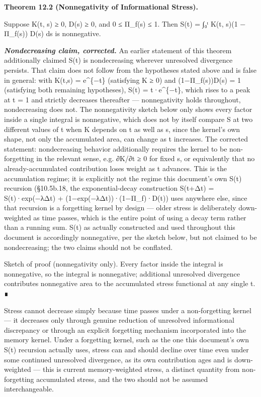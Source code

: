 \documentclass[
]{article}
\begin{document}
\textbf{Theorem 12.2 (Nonnegativity of Informational Stress).}

Suppose K(t, s) ≥ 0, D(s) ≥ 0, and 0 ≤ Π\_f(s) ≤ 1. Then S(t) = ∫₀ᵗ K(t,
s)(1 − Π\_f(s)) D(s) ds is nonnegative.

\emph{\textbf{Nondecreasing claim, corrected.}} An earlier statement of
this theorem additionally claimed S(t) is nondecreasing wherever
unresolved divergence persists. That claim does not follow from the
hypotheses stated above and is false in general: with K(t,s) =
e\^{}\{−t\} (satisfying K ≥ 0) and (1−Π\_f(s))D(s) = 1 (satisfying both
remaining hypotheses), S(t) = t·e\^{}\{−t\}, which rises to a peak at t
= 1 and strictly decreases thereafter --- nonnegativity holds
throughout, nondecreasing does not. The nonnegativity sketch below only
shows every factor inside a single integral is nonnegative, which does
not by itself compare S at two different values of t when K depends on t
as well as s, since the kernel's own shape, not only the accumulated
area, can change as t increases. The corrected statement: nondecreasing
behavior additionally requires the kernel to be non-forgetting in the
relevant sense, e.g. ∂K/∂t ≥ 0 for fixed s, or equivalently that no
already-accumulated contribution loses weight as t advances. This is the
accumulation regime; it is explicitly not the regime this document's own
S(t) recursion (§10.5b.18, the exponential-decay construction S(t+Δt) =
S(t)·exp(−λΔt) + (1−exp(−λΔt))·(1−Π\_f)·D(t)) uses anywhere else, since
that recursion is a forgetting kernel by design --- older stress is
deliberately down-weighted as time passes, which is the entire point of
using a decay term rather than a running sum. S(t) as actually
constructed and used throughout this document is accordingly
nonnegative, per the sketch below, but not claimed to be nondecreasing;
the two claims should not be conflated.

Sketch of proof (nonnegativity only). Every factor inside the integral
is nonnegative, so the integral is nonnegative; additional unresolved
divergence contributes nonnegative area to the accumulated stress
functional at any single t. ∎

Stress cannot decrease simply because time passes under a non-forgetting
kernel --- it decreases only through genuine reduction of unresolved
informational discrepancy or through an explicit forgetting mechanism
incorporated into the memory kernel. Under a forgetting kernel, such as
the one this document's own S(t) recursion actually uses, stress can and
should decline over time even under some continued unresolved
divergence, as its own contribution ages and is down-weighted --- this
is current memory-weighted stress, a distinct quantity from
non-forgetting accumulated stress, and the two should not be assumed
interchangeable.
\end{document}
